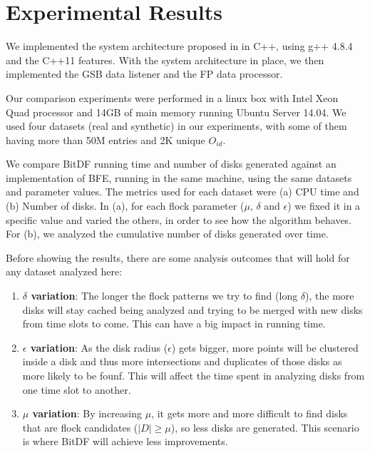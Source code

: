 \chapter{Experimental Results}
\label{chp:results}
We implemented the system architecture proposed in  in C++, using g++ 4.8.4 and the C++11
\citep{cpp11spec} features. With the system architecture in place, we then implemented the GSB data listener and the FP
data processor.

Our comparison experiments were performed in a linux box with Intel Xeon Quad processor and 14GB of main memory running
Ubuntu Server 14.04. We used four datasets (real and synthetic) in our experiments, with some of them having more than
50M entries and 2K unique $O_{id}$.

We compare BitDF running time and number of disks generated against an implementation of BFE, running in the same
machine, using the same datasets and parameter values. The metrics used for each dataset were (a) CPU time and (b)
Number of disks. In (a), for each flock parameter ($\mu$, $\delta$ and $\epsilon$) we fixed it in a specific value and
varied the others, in order to see how the algorithm behaves. For (b), we analyzed the cumulative number of disks
generated over time.

Before showing the results, there are some analysis outcomes that will hold for any dataset analyzed here:

\begin{enumerate}
    \item \textbf{$\delta$ variation}: The longer the flock patterns we try to find (long $\delta$), the more disks will
        stay cached being analyzed and trying to be merged with new disks from time slots to come. This can have a big
        impact in running time.\label{sssec:lvariation}

    \item \textbf{$\epsilon$ variation}: As the disk radius ($\epsilon$) gets bigger, more points will be clustered
        inside a disk and thus more intersections and duplicates of those disks as more likely to be founf. This will
        affect the time spent in analyzing disks from one time slot to another. \label{sssec:gvariation}

    \item \textbf{$\mu$ variation}: By increasing $\mu$, it gets more and more difficult to find disks that are flock
        candidates ($|D| \ge \mu$), so less disks are generated. This scenario is where BitDF will achieve less
        improvements. \label{sssec:nvariation}
\end{enumerate}

